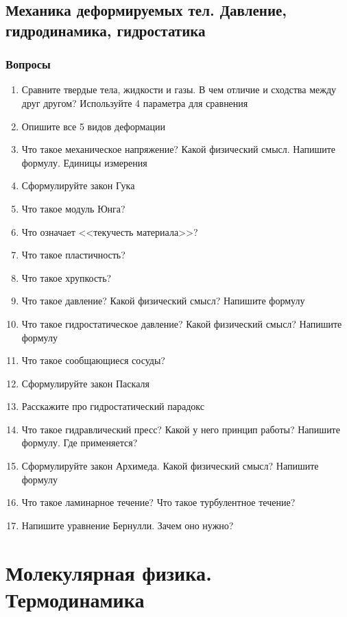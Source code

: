 \documentclass[12pt,a4paper]{report}
\begin{document}
\chapter{Механика деформируемых тел. Давление, гидродинамика, гидростатика}
\section{Вопросы}
\begin{enumerate}
\item Сравните твердые тела, жидкости и газы. В чем отличие и сходства между друг другом? Используйте 4 параметра для сравнения
\item Опишите все 5 видов деформации
\item Что такое механическое напряжение? Какой физический смысл. Напишите формулу. Единицы измерения
\item Сформулируйте закон Гука
\item Что такое модуль Юнга?
\item Что означает <<текучесть материала>>?
\item Что такое пластичность?
\item Что такое хрупкость?
\item Что такое давление? Какой физический смысл? Напишите формулу
\item Что такое гидростатическое давление? Какой физический смысл? Напишите формулу
\item Что такое сообщающиеся сосуды?
\item Сформулируйте закон Паскаля
\item Расскажите про гидростатический парадокс
\item Что такое гидравлический пресс? Какой у него принцип работы? Напишите формулу. Где применяется?
\item Сформулируйте закон Архимеда. Какой физический смысл? Напишите формулу
\item Что такое ламинарное течение? Что такое турбулентное течение?
\item Напишите уравнение Бернулли. Зачем оно нужно?
\end{enumerate}





\part{Молекулярная физика. Термодинамика}
\setcounter{chapter}{0}
\end{document}
